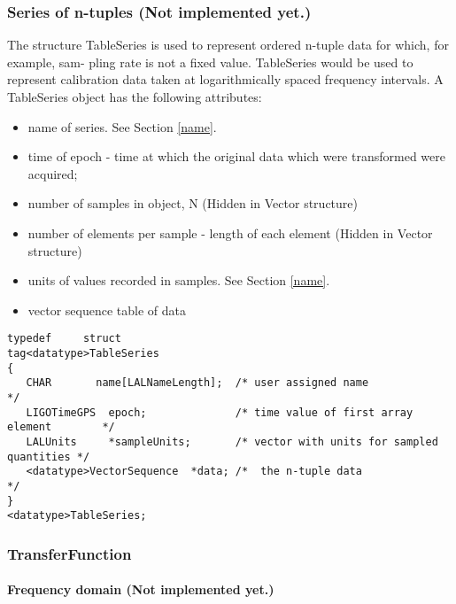 \documentclass[]{ligodcc}
\renewcommand{\texttt}[1]{{\ttfamily\color{blue}#1}}
\begin{document}
\subsubsection{Series of n-tuples  {\bf (Not implemented yet.)} }

The structure TableSeries is used to represent ordered n-tuple data
for which, for example, sam- pling rate is not a fixed value.
TableSeries would be used to represent calibration data taken at
logarithmically spaced frequency intervals. A TableSeries object has
the following attributes:

\begin{itemize}
\vspace{-0.1in}
\item
name of series. See Section \ref{name}.
\vspace{-0.1in}
\item
time of epoch - time at which the original data which were transformed were acquired;
\vspace{-0.1in}
\item
number of samples in object, N (Hidden in Vector structure)
\vspace{-0.1in}
\item
number of elements per sample - length of each element  (Hidden in Vector structure)
\vspace{-0.1in}
\item
units of values recorded in samples. See Section \ref{name}.
\vspace{-0.1in}
\item
vector sequence table of data 
\end{itemize}

{\footnotesize
\begin{verbatim}
typedef		struct 			
tag<datatype>TableSeries
{
   CHAR       name[LALNameLength];  /* user assigned name                       */
   LIGOTimeGPS  epoch;              /* time value of first array element        */
   LALUnits     *sampleUnits;       /* vector with units for sampled quantities */
   <datatype>VectorSequence  *data; /*  the n-tuple data                        */
}
<datatype>TableSeries;
\end{verbatim}}


\subsubsection{{\texttt {TransferFunction}}}

\paragraph{Frequency domain   {\bf (Not implemented yet.)} \\}
\end{document}
